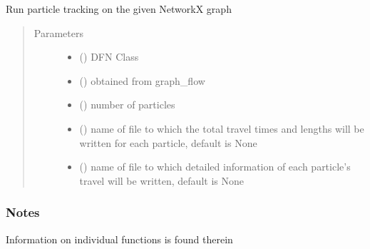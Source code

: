 \documentclass[letterpaper,10pt,english]{sphinxmanual}
\begin{document}
\begin{fulllineitems}
\begin{fulllineitems}
\label{\detokenize{pydfnworks:pydfnworks.general.dfnworks.DFNWORKS.run_graph_transport}}
Run  particle tracking on the given NetworkX graph
\begin{quote}\begin{description}
\item[{Parameters}] \leavevmode\begin{itemize}
\item {} 
 () \textendash{} DFN Class

\item {} 
 () \textendash{} obtained from graph\_flow

\item {} 
 () \textendash{} number of particles

\item {} 
 () \textendash{} name of file to  which the total travel times and lengths will be written for each particle, default is None

\item {} 
 () \textendash{} name of file to which detailed information of each particle’s travel will be written, default is None

\end{itemize}

\end{description}\end{quote}
\subsubsection*{Notes}

Information on individual functions is found therein

\end{fulllineitems}



\end{fulllineitems}
\end{document}
